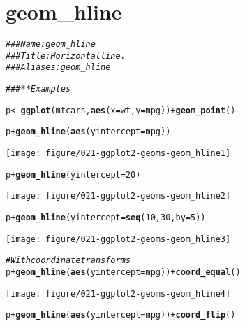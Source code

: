 \documentclass[a4paper,titlepage]{tufte-handout}\usepackage[]{graphicx}\usepackage[]{color}
\makeatletter
\def\maxwidth{ %
  \ifdim\Gin@nat@width>\linewidth
    \linewidth
  \else
    \Gin@nat@width
  \fi
}
\newcommand{\hlnum}[1]{\textcolor[rgb]{0.686,0.059,0.569}{#1}}%
\newcommand{\hlcom}[1]{\textcolor[rgb]{0.678,0.584,0.686}{\textit{#1}}}%
\newcommand{\hlopt}[1]{\textcolor[rgb]{0,0,0}{#1}}%
\newcommand{\hlstd}[1]{\textcolor[rgb]{0.345,0.345,0.345}{#1}}%
\newcommand{\hlkwb}[1]{\textcolor[rgb]{0.69,0.353,0.396}{#1}}%
\newcommand{\hlkwc}[1]{\textcolor[rgb]{0.333,0.667,0.333}{#1}}%
\newcommand{\hlkwd}[1]{\textcolor[rgb]{0.737,0.353,0.396}{\textbf{#1}}}%
\newenvironment{kframe}{%
 \def\at@end@of@kframe{}%
 \ifinner\ifhmode%
  \def\at@end@of@kframe{\end{minipage}}%
  \begin{minipage}{\columnwidth}%
 \fi\fi%
 \def\FrameCommand##1{\hskip\@totalleftmargin \hskip-\fboxsep
 \colorbox{shadecolor}{##1}\hskip-\fboxsep
     \hskip-\linewidth \hskip-\@totalleftmargin \hskip\columnwidth}%
 \MakeFramed {\advance\hsize-\width
   \@totalleftmargin\z@ \linewidth\hsize
   \@setminipage}}%
 {\par\unskip\endMakeFramed%
 \at@end@of@kframe}
\newenvironment{knitrout}{}{} %
\makeatother
\begin{document}
\section{geom\_hline}

\begin{knitrout}
\color{fgcolor}\begin{kframe}
\begin{alltt}
\hlcom{### Name: geom_hline}
\hlcom{### Title: Horizontal line.}
\hlcom{### Aliases: geom_hline}

\hlcom{### ** Examples}

\hlstd{p} \hlkwb{<-} \hlkwd{ggplot}\hlstd{(mtcars,} \hlkwd{aes}\hlstd{(}\hlkwc{x} \hlstd{= wt,} \hlkwc{y}\hlstd{=mpg))} \hlopt{+} \hlkwd{geom_point}\hlstd{()}

\hlstd{p} \hlopt{+} \hlkwd{geom_hline}\hlstd{(}\hlkwd{aes}\hlstd{(}\hlkwc{yintercept}\hlstd{=mpg))}
\end{alltt}
\end{kframe}
\texttt{[image: figure/021-ggplot2-geoms-geom\_hline1]} 
\begin{kframe}\begin{alltt}
\hlstd{p} \hlopt{+} \hlkwd{geom_hline}\hlstd{(}\hlkwc{yintercept}\hlstd{=}\hlnum{20}\hlstd{)}
\end{alltt}
\end{kframe}
\texttt{[image: figure/021-ggplot2-geoms-geom\_hline2]} 
\begin{kframe}\begin{alltt}
\hlstd{p} \hlopt{+} \hlkwd{geom_hline}\hlstd{(}\hlkwc{yintercept}\hlstd{=}\hlkwd{seq}\hlstd{(}\hlnum{10}\hlstd{,} \hlnum{30}\hlstd{,} \hlkwc{by}\hlstd{=}\hlnum{5}\hlstd{))}
\end{alltt}
\end{kframe}
\texttt{[image: figure/021-ggplot2-geoms-geom\_hline3]} 
\begin{kframe}\begin{alltt}
\hlcom{# With coordinate transforms}
\hlstd{p} \hlopt{+} \hlkwd{geom_hline}\hlstd{(}\hlkwd{aes}\hlstd{(}\hlkwc{yintercept}\hlstd{=mpg))} \hlopt{+} \hlkwd{coord_equal}\hlstd{()}
\end{alltt}
\end{kframe}
\texttt{[image: figure/021-ggplot2-geoms-geom\_hline4]} 
\begin{kframe}\begin{alltt}
\hlstd{p} \hlopt{+} \hlkwd{geom_hline}\hlstd{(}\hlkwd{aes}\hlstd{(}\hlkwc{yintercept}\hlstd{=mpg))} \hlopt{+} \hlkwd{coord_flip}\hlstd{()}

\end{alltt}
\end{kframe}
\end{knitrout}
\end{document}

